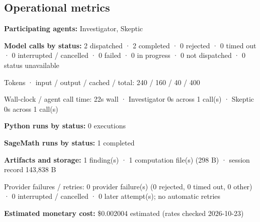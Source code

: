 \documentclass[11pt]{article}
\begin{document}
\subsection{Operational metrics}
\textbf{Participating agents:} Investigator, Skeptic\par
\textbf{Model calls by status:} 2 dispatched · 2 completed · 0 rejected · 0 timed out · 0 interrupted / cancelled · 0 failed · 0 in progress · 0 not dispatched · 0 status unavailable\par
Tokens · input / output / cached / total: 240 / 160 / 40 / 400\par
Wall-clock / agent call time: 22s wall · Investigator 0s across 1 call(s) · Skeptic 0s across 1 call(s)\par
\textbf{Python runs by status:} 0 executions\par
\textbf{SageMath runs by status:} 1 completed\par
\textbf{Artifacts and storage:} 1 finding(s) · 1 computation file(s) (298 B) · session record 143,838 B\par
Provider failures / retries: 0 provider failure(s) (0 rejected, 0 timed out, 0 other) · 0 interrupted / cancelled · 0 later attempt(s); no automatic retries\par
\textbf{Estimated monetary cost:} \$0.002004 estimated (rates checked 2026-10-23)\par
\end{document}
